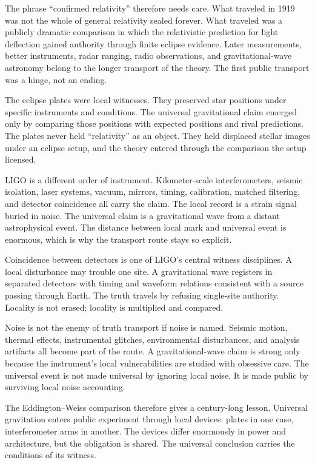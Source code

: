 The phrase ``confirmed relativity'' therefore needs care. What traveled in
1919 was not the whole of general relativity sealed forever. What traveled
was a publicly dramatic comparison in which the relativistic prediction
for light deflection gained authority through finite eclipse evidence.
Later measurements, better instruments, radar ranging, radio observations,
and gravitational-wave astronomy belong to the longer transport of the
theory. The first public transport was a hinge, not an ending.

The eclipse plates were local witnesses. They preserved star positions
under specific instruments and conditions. The universal gravitational
claim emerged only by comparing those positions with expected positions
and rival predictions. The plates never held ``relativity'' as an object.
They held displaced stellar images under an eclipse setup, and the theory
entered through the comparison the setup licensed.

LIGO is a different order of instrument. Kilometer-scale interferometers,
seismic isolation, laser systems, vacuum, mirrors, timing, calibration,
matched filtering, and detector coincidence all carry the claim. The local
record is a strain signal buried in noise. The universal claim is a
gravitational wave from a distant astrophysical event. The distance between
local mark and universal event is enormous, which is why the transport
route stays so explicit.

Coincidence between detectors is one of LIGO's central witness
disciplines. A local disturbance may trouble one site. A gravitational
wave registers in separated detectors with timing and waveform relations
consistent with a source passing through Earth. The truth travels by
refusing single-site authority. Locality is not erased; locality is
multiplied and compared.

Noise is not the enemy of truth transport if noise is named. Seismic
motion, thermal effects, instrumental glitches, environmental
disturbances, and analysis artifacts all become part of the route. A
gravitational-wave claim is strong only because the instrument's local
vulnerabilities are studied with obsessive care. The universal event is
not made universal by ignoring local noise. It is made public by surviving
local noise accounting.

The Eddington--Weiss comparison therefore gives a century-long lesson.
Universal gravitation enters public experiment through local devices:
plates in one case, interferometer arms in another. The devices differ
enormously in power and architecture, but the obligation is shared. The
universal conclusion carries the conditions of its witness.

